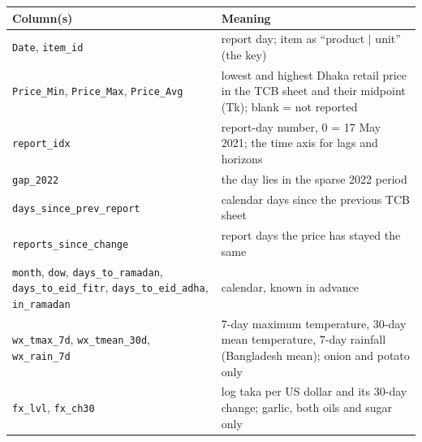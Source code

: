 \begin{tabularx}{\linewidth}{>{\raggedright\arraybackslash}p{5.2cm}X}
\toprule
\textbf{Column(s)} & \textbf{Meaning} \\
\midrule
\texttt{Date}, \texttt{item\_id} & report day; item as ``product $|$ unit'' (the key) \\
\texttt{Price\_Min}, \texttt{Price\_Max}, \texttt{Price\_Avg} & lowest and highest Dhaka retail price in the TCB sheet and their midpoint (Tk); blank = not reported \\
\texttt{report\_idx} & report-day number, 0 = 17 May 2021; the time axis for lags and horizons \\
\texttt{gap\_2022} & the day lies in the sparse 2022 period \\
\texttt{days\_since\_prev\_report} & calendar days since the previous TCB sheet \\
\texttt{reports\_since\_change} & report days the price has stayed the same \\
\texttt{month}, \texttt{dow}, \texttt{days\_to\_ramadan}, \texttt{days\_to\_eid\_fitr}, \texttt{days\_to\_eid\_adha}, \texttt{in\_ramadan} & calendar, known in advance \\
\texttt{wx\_tmax\_7d}, \texttt{wx\_tmean\_30d}, \texttt{wx\_rain\_7d} & 7-day maximum temperature, 30-day mean temperature, 7-day rainfall (Bangladesh mean); onion and potato only \\
\texttt{fx\_lvl}, \texttt{fx\_ch30} & log taka per US dollar and its 30-day change; garlic, both oils and sugar only \\
\bottomrule
\end{tabularx}
